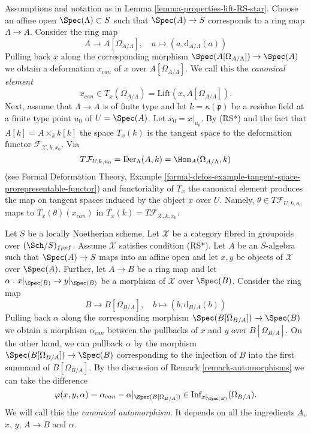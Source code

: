 \begin{remark}
\label{remark-canonical-element}
Assumptions and notation as in Lemma \ref{lemma-properties-lift-RS-star}.
Choose an affine open $\Spec(\Lambda) \subset S$ such that $\Spec(A) \to S$
corresponds to a ring map $\Lambda \to A$. Consider the ring map
$$
A \longrightarrow A[\Omega_{A/\Lambda}],
\quad
a \longmapsto (a, \text{d}_{A/\Lambda}(a))
$$
Pulling back $x$ along the corresponding morphism
$\Spec(A[\Omega_{A/\Lambda}]) \to \Spec(A)$ we obtain a
deformation $x_{can}$ of $x$ over $A[\Omega_{A/\Lambda}]$. We call this
the {\it canonical element}
$$
x_{can} \in T_x(\Omega_{A/\Lambda}) = \text{Lift}(x, A[\Omega_{A/\Lambda}]).
$$
Next, assume that $\Lambda \to A$ is of finite type and let
$k = \kappa(\mathfrak p)$ be a residue field at a finite type point $u_0$
of $U = \Spec(A)$. Let $x_0 = x|_{u_0}$. By (RS*) and the fact that
$A[k] = A \times_k k[k]$ the space $T_x(k)$ is the tangent space to the
deformation functor $\mathcal{F}_{\mathcal{X}, k, x_0}$. Via
$$
T\mathcal{F}_{U, k, u_0} =
\text{Der}_\Lambda(A, k) = \Hom_A(\Omega_{A/\Lambda}, k)
$$
(see Formal Deformation Theory, Example
\ref{formal-defos-example-tangent-space-prorepresentable-functor})
and functoriality of $T_x$ the canonical element produces the map
on tangent spaces induced by the object $x$ over $U$. Namely,
$\theta \in T\mathcal{F}_{U, k, u_0}$ maps to $T_x(\theta)(x_{can})$
in $T_x(k) = T\mathcal{F}_{\mathcal{X}, k, x_0}$.
\end{remark}

\begin{remark}
\label{remark-canonical-isomorphism}
Let $S$ be a locally Noetherian scheme. Let $\mathcal{X}$ be a category
fibred in groupoids over $(\Sch/S)_{fppf}$. Assume $\mathcal{X}$ satisfies
condition (RS*). Let $A$ be an $S$-algebra such that
$\Spec(A) \to S$ maps into an affine open and let $x, y$ be objects of
$\mathcal{X}$ over $\Spec(A)$. Further, let $A \to B$ be a ring map and
let $\alpha : x|_{\Spec(B)} \to y|_{\Spec(B)}$ be a morphism of
$\mathcal{X}$ over $\Spec(B)$. Consider the ring map
$$
B \longrightarrow B[\Omega_{B/A}],
\quad
b \longmapsto (b, \text{d}_{B/A}(b))
$$
Pulling back $\alpha$ along the corresponding morphism
$\Spec(B[\Omega_{B/A}]) \to \Spec(B)$ we obtain a
morphism $\alpha_{can}$ between the pullbacks of $x$ and $y$ over
$B[\Omega_{B/A}]$. On the other hand, we can pullback $\alpha$
by the morphism $\Spec(B[\Omega_{B/A}]) \to \Spec(B)$ corresponding
to the injection of $B$ into the first summand of $B[\Omega_{B/A}]$.
By the discussion of Remark \ref{remark-automorphisms}
we can take the difference
$$
\varphi(x, y, \alpha) = \alpha_{can} - \alpha|_{\Spec(B[\Omega_{B/A}])} \in
\text{Inf}_{x|_{\Spec(B)}}(\Omega_{B/A}).
$$
We will call this the {\it canonical automorphism}. It depends
on all the ingredients $A$, $x$, $y$, $A \to B$ and $\alpha$.
\end{remark}

